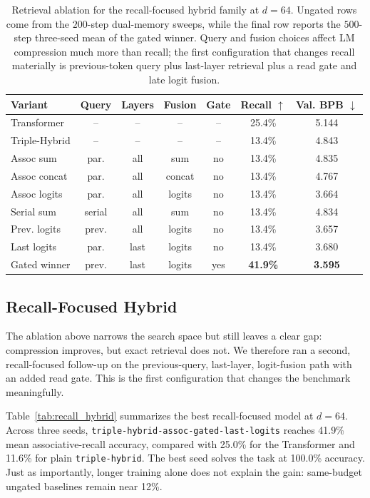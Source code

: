 \documentclass[11pt]{article}
\begin{document}
\begin{table}[t]
\centering
\small
\begin{tabular}{lcccccc}
\toprule
Variant & Query & Layers & Fusion & Gate & Recall $\uparrow$ & Val. BPB $\downarrow$ \\
\midrule
Transformer & -- & -- & -- & -- & 25.4\% & 5.144 \\
Triple-Hybrid & -- & -- & -- & -- & 13.4\% & 4.843 \\
Assoc sum & par. & all & sum & no & 13.4\% & 4.835 \\
Assoc concat & par. & all & concat & no & 13.4\% & 4.767 \\
Assoc logits & par. & all & logits & no & 13.4\% & 3.664 \\
Serial sum & serial & all & sum & no & 13.4\% & 4.834 \\
Prev. logits & prev. & all & logits & no & 13.4\% & 3.657 \\
Last logits & par. & last & logits & no & 13.4\% & 3.680 \\
Gated winner & prev. & last & logits & yes & \textbf{41.9\%} & \textbf{3.595} \\
\bottomrule
\end{tabular}
\caption{Retrieval ablation for the recall-focused hybrid family at $d=64$.
Ungated rows come from the $200$-step dual-memory sweeps, while the final row
reports the $500$-step three-seed mean of the gated winner. Query and fusion
choices affect LM compression much more than recall; the first configuration
that changes recall materially is previous-token query plus last-layer
retrieval plus a read gate and late logit fusion.}
\label{tab:retrieval_ablation}
\end{table}

\subsection{Recall-Focused Hybrid}
The ablation above narrows the search space but still leaves a clear gap:
compression improves, but exact retrieval does not. We therefore ran a second,
recall-focused follow-up on the previous-query, last-layer, logit-fusion path
with an added read gate. This is the first configuration that changes the
benchmark meaningfully.

Table~\ref{tab:recall_hybrid} summarizes the best recall-focused model at
$d=64$. Across three seeds, \texttt{triple-hybrid-assoc-gated-last-logits}
reaches 41.9\% mean associative-recall accuracy, compared with 25.0\% for the
Transformer and 11.6\% for plain \texttt{triple-hybrid}. The best seed solves
the task at 100.0\% accuracy. Just as importantly, longer training alone does
not explain the gain: same-budget ungated baselines remain near 12\%.
\end{document}
